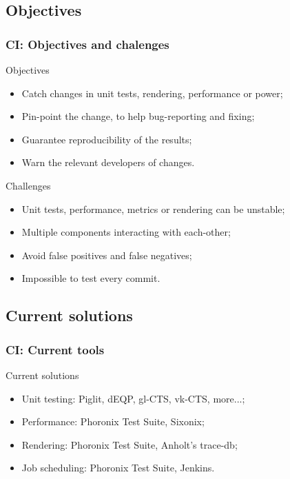 \documentclass[11pt,english,compress]{beamer}
\begin{document}
\subsection*{Objectives}
\begin{frame}
	\frametitle{CI: Objectives and chalenges}
	
	\begin{block}{Objectives}
		\begin{itemize}
			\item Catch changes in unit tests, rendering, performance or power;
			\item Pin-point the change, to help bug-reporting and fixing;
			\item Guarantee reproducibility of the results;
			\item Warn the relevant developers of changes.
		\end{itemize}
	\end{block}
	
	\pause
	
	\begin{block}{Challenges}
		\begin{itemize}
			\item Unit tests, performance, metrics or rendering can be unstable;
			\item Multiple components interacting with each-other;
			\item Avoid false positives and false negatives;
			\item Impossible to test every commit.
		\end{itemize}
	\end{block}
\end{frame}

\subsection*{Current solutions}
\begin{frame}
	\frametitle{CI: Current tools}
	
	\begin{block}{Current solutions}
		\begin{itemize}
			\item Unit testing: Piglit, dEQP, gl-CTS, vk-CTS, more...;
			\item Performance: Phoronix Test Suite, Sixonix;
			\item Rendering: Phoronix Test Suite, Anholt's trace-db;
			\item Job scheduling: Phoronix Test Suite, Jenkins.
		\end{itemize}
	\end{block}
\end{frame}
\end{document}
